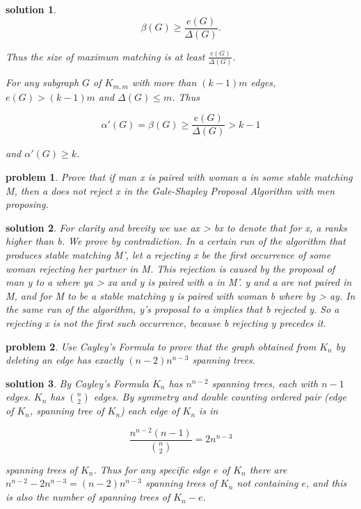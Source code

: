 \documentclass[twocolumn]{article}
\newtheorem{problem}{problem}
\newtheorem{solution}{solution}
\begin{document}
\begin{CJK*}{UTF8}{bkai}
\begin{solution}
\[
\beta(G) \geq \frac{e(G)}{\Delta(G)}.
\]

Thus the size of maximum matching is at least \( \frac{e(G)}{\Delta(G)} \).

For any subgraph \( G \) of \( K_{m,m} \) with more than \( (k - 1)m \) edges, \( e(G) > (k - 1)m \) and \( \Delta(G) \leq m \). Thus

\[
\alpha'(G) = \beta(G) \geq \frac{e(G)}{\Delta(G)} > k - 1
\]

and \( \alpha'(G) \geq k \).
\end{solution}

\begin{problem}
     Prove that if man x is paired with woman a in some stable matching M, then a does not reject x
 in the Gale-Shapley Proposal Algorithm with men proposing.
\end{problem}

\begin{solution}
     For clarity and brevity we use ax > bx to denote that for x, a ranks higher than b.
 We prove by contradiction. In a certain run of the algorithm that produces stable matching M',
 let a rejecting x be the first occurrence of some woman rejecting her partner in M. This rejection
 is caused by the proposal of man y to a where ya > xa and y is paired with a in M'. y and a are
 not paired in M, and for M to be a stable matching y is paired with woman b where by > ay. In
 the same run of the algorithm, y's proposal to a implies that b rejected y. So a rejecting x is not
 the first such occurrence, because b rejecting y precedes it.
\end{solution}

\begin{problem}
    Use Cayley's Formula to prove that the graph obtained from \( K_n \) by deleting an edge has exactly \( (n - 2)n^{n - 3} \) spanning trees.

\end{problem}

\begin{solution}
By Cayley's Formula \( K_n \) has \( n^{n - 2} \) spanning trees, each with \( n - 1 \) edges. \( K_n \) has \( \binom{n}{2} \) edges. By symmetry and double counting ordered pair (edge of \( K_n \), spanning tree of \( K_n \)) each edge of \( K_n \) is in

\[
\frac{n^{n - 2} (n - 1)}{\binom{n}{2}} = 2n^{n - 3}
\]

spanning trees of \( K_n \). Thus for any specific edge \( e \) of \( K_n \) there are \( n^{n - 2} - 2n^{n - 3} = (n - 2)n^{n - 3} \) spanning trees of \( K_n \) not containing \( e \), and this is also the number of spanning trees of \( K_n - e \).
\end{solution}



\end{CJK*}
\end{document}
